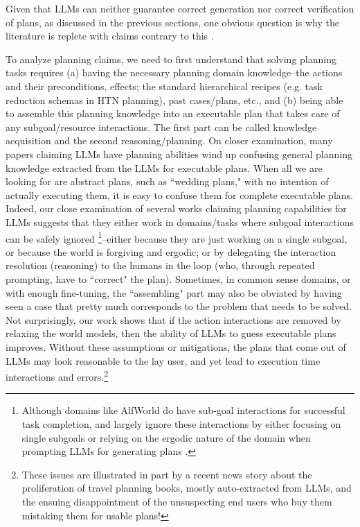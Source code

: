 \documentclass{article}
\newcommand{\rao}[1]{\noindent\textcolor{red}{#1}}
\theoremstyle{plain}
\theoremstyle{definition}
\theoremstyle{remark}
\begin{document}
Given that LLMs can neither guarantee correct generation nor correct verification of plans, as discussed in the previous sections, one obvious question is why the literature is replete with claims contrary to this
\cite{bairi2023codeplan, yao2023react, shinn2023reflexion,yao2023tree,weng2023large,huang2022inner}. 

 To analyze planning claims, we need to first understand that solving planning tasks requires (a) having the necessary planning domain knowledge–the actions and their preconditions, effects; the standard hierarchical recipes (e.g. task reduction schemas in HTN planning), past cases/plans, etc., and (b) being able to assemble this planning knowledge into an executable plan that takes care of any subgoal/resource interactions. The first part can be called knowledge acquisition and the second reasoning/planning. On closer examination, many papers claiming LLMs have planning abilities wind up confusing general planning knowledge extracted from the LLMs for executable plans. When all we are looking for are abstract plans, such as ``wedding plans," with no intention of actually executing them, it is easy to confuse them for complete executable plans.
%
Indeed, our close examination of several works claiming planning
capabilities for LLMs \cite{llm-tutorial} suggests that they either work
in domains/tasks where subgoal interactions can be safely ignored
\cite{yao2023react, shinn2023reflexion}\footnote{Although domains like
AlfWorld \cite{ALFWorld20} do have sub-goal interactions for successful
task completion, \cite{yao2023react} and \cite{shinn2023reflexion}
largely ignore these interactions by either focusing on single subgoals
or relying on the ergodic nature of the domain
when prompting LLMs for generating plans \cite{mudit-siddhant-react}.}--either because they are
just working on a single subgoal, or because the world is forgiving and
ergodic; or by delegating the interaction resolution (reasoning)  to the
humans in the loop (who, through repeated prompting, have to ``correct"
the plan). Sometimes, in common sense domains, or with enough
fine-tuning, the ``assembling" part may also be obviated by having seen
a case that pretty much corresponds to the problem that needs to be
solved. Not surprisingly, our work  \cite{valmeekam2023on} shows that if the action interactions are removed by relaxing the world models, then the ability of LLMs to guess executable plans improves. Without these assumptions or mitigations, the plans that come out of LLMs may look reasonable to the lay user, and yet lead to execution time interactions and errors.\footnote{These issues are illustrated in part by a recent news story \cite{nyt-travel-books} about the proliferation of travel planning books, mostly auto-extracted from LLMs, and the ensuing disappointment of the unsuspecting end users who buy them mistaking them for usable plans!} 
\end{document}
